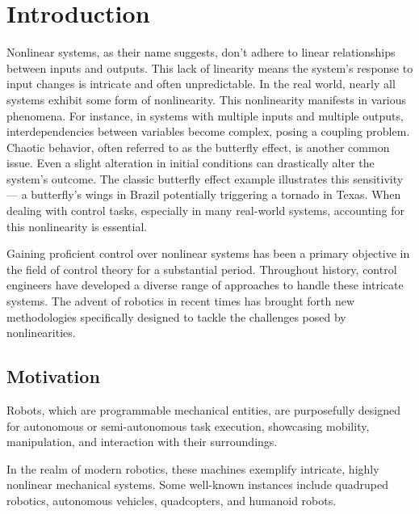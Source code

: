 \chapter{Introduction}
Nonlinear systems, as their name suggests, don't adhere to linear relationships between inputs and outputs. This lack of linearity means the system's response to input changes is intricate and often unpredictable. In the real world, nearly all systems exhibit some form of nonlinearity. This nonlinearity manifests in various phenomena. For instance, in systems with multiple inputs and multiple outputs, interdependencies between variables become complex, posing a coupling problem. Chaotic behavior, often referred to as the butterfly effect, is another common issue. Even a slight alteration in initial conditions can drastically alter the system's outcome. The classic butterfly effect example illustrates this sensitivity — a butterfly's wings in Brazil potentially triggering a tornado in Texas. When dealing with control tasks, especially in many real-world systems, accounting for this nonlinearity is essential.

Gaining proficient control over nonlinear systems has been a primary objective in the field of control theory for a substantial period. Throughout history, control engineers have developed a diverse range of approaches to handle these intricate systems. The advent of robotics in recent times has brought forth new methodologies specifically designed to tackle the challenges posed by nonlinearities.

\section{Motivation}
Robots, which are programmable mechanical entities, are purposefully designed for autonomous or semi-autonomous task execution, showcasing mobility, manipulation, and interaction with their surroundings.

In the realm of modern robotics, these machines exemplify intricate, highly nonlinear mechanical systems. Some well-known instances include quadruped robotics, autonomous vehicles, quadcopters, and humanoid robots.

